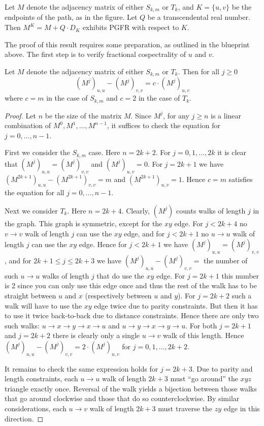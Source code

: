 \begin{theorem}\label{thm:main_K2}
Let $M$ denote the adjacency matrix of either $S_{k,m}$ or $T_k$, and $K = \{u,v\}$ be the endpoints of the path, as in the figure. Let $Q$ be a transcendental real number. Then $M^K = M + Q \cdot D_K$ exhibits PGFR with respect to $K$.
\end{theorem}

The proof of this result requires some preparation, as outlined in the blueprint above. The first step is to verify fractional cospectrality of $u$ and $v$.

\begin{lemma}\label{lem:uv_cospectral}
Let $M$ denote the adjacency matrix of either $S_{k,m}$ or $T_k$. Then for all $j \geq 0$
\[ (M^j)_{u,u} - (M^j)_{v,v} = c \cdot (M^j)_{u,v} \]
where $c = m$ in the case of $S_{k,m}$ and $c = 2$ in the case of $T_k$. 
\end{lemma}

\begin{proof}
Let $n$ be the size of the matrix $M$. Since $M^j$, for any $j \geq n$ is a linear combination of $M^0, M^1, \dots, M^{n-1}$, it suffices to check the equation for $j=0,\dots, n-1$. 

First we consider the $S_{k,m}$ case. Here $n = 2k+2$. For $j=0,1,\dots,2k$ it is clear that $(M^j)_{u,u} = (M^j)_{v,v}$ and $(M^j)_{u,v} = 0$. For $j = 2k+1$ we have $(M^{2k+1})_{u,u} - (M^{2k+1})_{v,v} = m$ and $(M^{2k+1})_{u,v} = 1$. Hence $c=m$ satisfies the equation for all $j=0,\dots, n-1$. 

Next we consider $T_k$. Here $n = 2k+4$. Clearly, $(M^j)$ counts walks of length $j$ in the graph. This graph is symmetric, except for the $xy$ edge. For $j < 2k+4$ no $v \to v$ walk of length $j$ can use the $xy$ edge, and for $j < 2k+1$ no $u \to u$ walk of length $j$ can use the $xy$ edge. Hence for $j < 2k+1$ we have $(M^j)_{u,u} = (M^j)_{v,v}$, and for $2k+1 \leq j \leq 2k+3$ we have $(M^j)_{u,u} - (M^j)_{v,v} = $ the number of such $u\to u$ walks of length $j$ that do use the $xy$ edge.  For $j=2k+1$ this number is 2 since you can only use this edge once and thus the rest of the walk has to be straight between $u$ and $x$ (respectively between $u$ and $y$). For $j=2k+2$ such a walk will have to use the $xy$ edge twice due to parity constraints. But then it has to use it twice back-to-back due to distance constraints. Hence there are only two such walks: $u \to x \to y \to x \to u$ and $u \to y \to x \to y \to u$. For both $j=2k+1$ and $j=2k+2$ there is clearly only a single $u\to v$ walk of this length. Hence $(M^j)_{u,u} - (M^j)_{v,v} = 2 \cdot (M^j)_{u,v}$ for $j=0,1,\dots, 2k+2$. 

It remains to check the same expression holds for $j=2k+3$. Due to parity and length constraints, each $u\to u$ walk of length $2k+3$ must ``go around'' the $xyz$ triangle exactly once. Reversal of the walk yields a bijection between those walks that go around clockwise and those that do so counterclockwise. By similar considerations, each $u \to v$ walk of length $2k+3$ must traverse the $zy$ edge in this direction. 
\end{proof}

